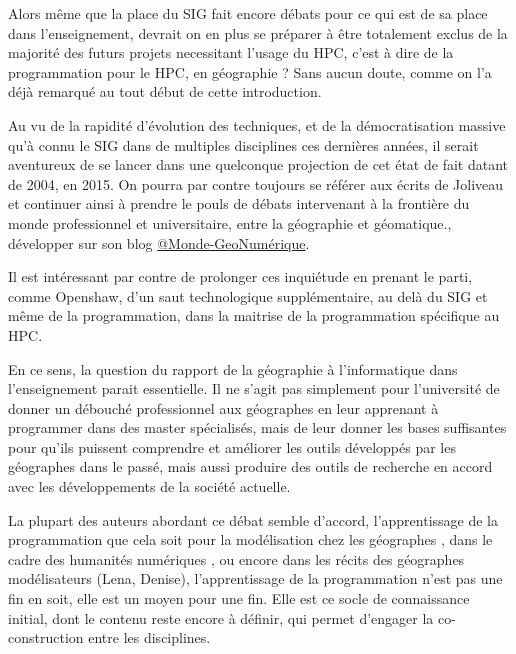 Alors même que la place du SIG fait encore débats pour ce qui est de sa place dans l'enseignement, devrait on en plus se préparer à être totalement exclus de la majorité des futurs projets necessitant l’usage du HPC, c'est à dire de la programmation pour le HPC, en géographie ? Sans aucun doute, comme on l'a déjà remarqué au tout début de cette introduction.

Au vu de la rapidité d'évolution des techniques, et de la démocratisation massive qu'à connu le SIG dans de multiples disciplines ces dernières années, il serait aventureux de se lancer dans une quelconque projection de cet état de fait datant de 2004, en 2015. On pourra par contre toujours se référer aux écrits de Joliveau et continuer ainsi à prendre le pouls de débats intervenant à la frontière du monde professionnel et universitaire, entre la géographie et géomatique.,  développer sur son blog \href{https://mondegeonumerique.wordpress.com/}{@Monde-GeoNumérique}.

Il est intéressant par contre de prolonger ces inquiétude en prenant le parti, comme Openshaw, d'un saut technologique supplémentaire, au delà du SIG et même de la programmation, dans la maitrise de la programmation spécifique au HPC.



En ce sens, la question du rapport de la géographie à l'informatique dans l'enseignement parait essentielle. Il ne s'agit pas simplement pour l'université de donner un débouché professionnel aux géographes en leur apprenant à programmer dans des master spécialisés, mais de leur donner les bases suffisantes pour qu'ils puissent comprendre et améliorer les outils développés par les géographes dans le passé, mais aussi produire des outils de recherche en accord avec les développements de la société actuelle.

La plupart des auteurs abordant ce débat semble d'accord, l'apprentissage de la programmation que cela soit pour la modélisation chez les géographes \autocite[64]{Banos2013}, dans le cadre des humanités numériques , ou encore dans les récits des géographes modélisateurs (Lena, Denise), l'apprentissage de la programmation n'est pas une fin en soit, elle est un moyen pour une fin. Elle est ce socle de connaissance initial, dont le contenu reste encore à définir, qui permet d'engager la co-construction entre les disciplines.

